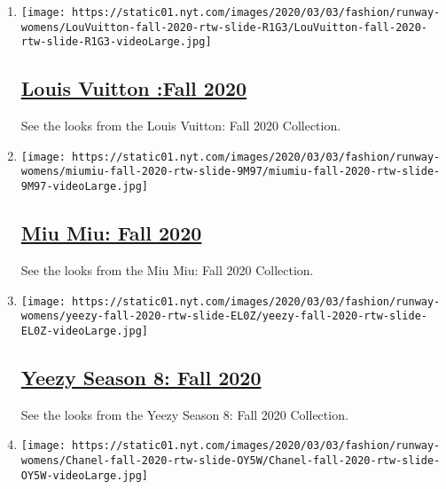 \begin{enumerate}
\def\labelenumi{\arabic{enumi}.}
\item
  \texttt{[image: https://static01.nyt.com/images/2020/03/03/fashion/runway-womens/LouVuitton-fall-2020-rtw-slide-R1G3/LouVuitton-fall-2020-rtw-slide-R1G3-videoLarge.jpg]}

  \hypertarget{louis-vuitton-fall-2020}{%
  \subsection{\texorpdfstring{\href{/slideshow/2020/03/03/fashion/runway-womens/louis-vuitton-fall-2020.html}{Louis
  Vuitton :Fall
  2020}}{Louis Vuitton :Fall 2020}}\label{louis-vuitton-fall-2020}}

  See the looks from the Louis Vuitton: Fall 2020 Collection.
\item
  \texttt{[image: https://static01.nyt.com/images/2020/03/03/fashion/runway-womens/miumiu-fall-2020-rtw-slide-9M97/miumiu-fall-2020-rtw-slide-9M97-videoLarge.jpg]}

  \hypertarget{miu-miu-fall-2020}{%
  \subsection{\texorpdfstring{\href{/slideshow/2020/03/03/fashion/runway-womens/miu-miu-fall-2020.html}{Miu
  Miu: Fall 2020}}{Miu Miu: Fall 2020}}\label{miu-miu-fall-2020}}

  See the looks from the Miu Miu: Fall 2020 Collection.
\item
  \texttt{[image: https://static01.nyt.com/images/2020/03/03/fashion/runway-womens/yeezy-fall-2020-rtw-slide-EL0Z/yeezy-fall-2020-rtw-slide-EL0Z-videoLarge.jpg]}

  \hypertarget{yeezy-season-8-fall-2020}{%
  \subsection{\texorpdfstring{\href{/slideshow/2020/03/03/fashion/runway-womens/yeezy-season-8-fall-2020.html}{Yeezy
  Season 8: Fall
  2020}}{Yeezy Season 8: Fall 2020}}\label{yeezy-season-8-fall-2020}}

  See the looks from the Yeezy Season 8: Fall 2020 Collection.
\item
  \texttt{[image: https://static01.nyt.com/images/2020/03/03/fashion/runway-womens/Chanel-fall-2020-rtw-slide-OY5W/Chanel-fall-2020-rtw-slide-OY5W-videoLarge.jpg]}

  \hypertarget{chanel-fall-2020}{%
}
\end{enumerate}
